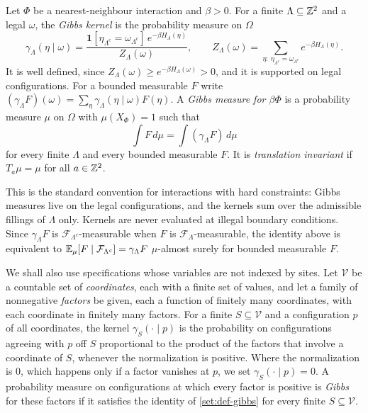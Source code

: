 \begin{definition}\label{set:def-gibbs}
Let $\Phi$ be a nearest-neighbour interaction and $\beta>0$. For a finite $\Lambda\subseteq\mathbb{Z}^2$ and a legal $\omega$, the \emph{Gibbs kernel} is the probability measure on $\Omega$
\[
\gamma_\Lambda(\eta\mid\omega)=\frac{\mathbf 1[\eta_{\Lambda^c}=\omega_{\Lambda^c}]\,e^{-\beta H_\Lambda(\eta)}}{Z_\Lambda(\omega)},\qquad Z_\Lambda(\omega)=\sum_{\eta:\ \eta_{\Lambda^c}=\omega_{\Lambda^c}}e^{-\beta H_\Lambda(\eta)} .
\]
It is well defined, since $Z_\Lambda(\omega)\ge e^{-\beta H_\Lambda(\omega)}>0$, and it is supported on legal configurations. For a bounded measurable $F$ write $(\gamma_\Lambda F)(\omega)=\sum_\eta\gamma_\Lambda(\eta\mid\omega)F(\eta)$. A \emph{Gibbs measure for $\beta\Phi$} is a probability measure $\mu$ on $\Omega$ with $\mu(X_\Phi)=1$ such that
\[
\int F\,d\mu=\int(\gamma_\Lambda F)\,d\mu
\]
for every finite $\Lambda$ and every bounded measurable $F$. It is \emph{translation invariant} if $T_a\mu=\mu$ for all $a\in\mathbb{Z}^2$.
\end{definition}

This is the standard convention for interactions with hard constraints: Gibbs measures live on the legal configurations, and the kernels sum over the admissible fillings of $\Lambda$ only. Kernels are never evaluated at illegal boundary conditions. Since $\gamma_\Lambda F$ is $\mathcal F_{\Lambda^c}$-measurable when $F$ is $\mathcal F_\Lambda$-measurable, the identity above is equivalent to $\mathbb{E}_\mu[F\mid\mathcal F_{\Lambda^c}]=\gamma_\Lambda F$ $\mu$-almost surely for bounded measurable $F$.

We shall also use specifications whose variables are not indexed by sites. Let $\mathcal V$ be a countable set of \emph{coordinates}, each with a finite set of values, and let a family of nonnegative \emph{factors} be given, each a function of finitely many coordinates, with each coordinate in finitely many factors. For a finite $S\subseteq\mathcal V$ and a configuration $p$ of all coordinates, the kernel $\gamma_S(\cdot\mid p)$ is the probability on configurations agreeing with $p$ off $S$ proportional to the product of the factors that involve a coordinate of $S$, whenever the normalization is positive. Where the normalization is $0$, which happens only if a factor vanishes at $p$, we set $\gamma_S(\cdot\mid p)=0$. A probability measure on configurations at which every factor is positive is \emph{Gibbs} for these factors if it satisfies the identity of \cref{set:def-gibbs} for every finite $S\subseteq\mathcal V$.

